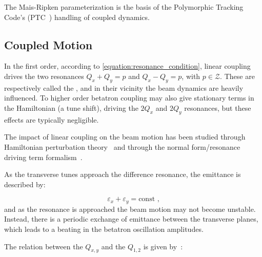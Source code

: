 The Mais-Ripken parameterization is the basis of the Polymorphic Tracking Code's (PTC~\cite{CODE:Schmidt_Forest:PTC}) handling of coupled dynamics. 

\subsection{Coupled Motion}
\label{subsection:coupled_motion}

In the first order, according to \cref{equation:resonance_condition}, linear coupling drives the two resonances \(Q_x + Q_y = p\) and \(Q_x - Q_y = p\), with \(p \in \mathcal{Z}\).
These are respectively called the , and in their vicinity the beam dynamics are heavily influenced.
To higher order betatron coupling may also give stationary terms in the Hamiltonian (a tune shift), driving the \(2 Q_x\) and \(2 Q_y\) resonances, but these effects are typically negligible.

The impact of linear coupling on the beam motion has been studied through Hamiltonian perturbation theory~\cite{PHREV:Guignard:Betatron_Coupling_Radiation,BOOK:Wiedemann:Particle_Accelerator_Physics} and through the normal form/resonance driving term formalism~\cite{PHD:Franchi}.

As the transverse tunes approach the difference resonance, the emittance is described by:

\begin{equation}
    \varepsilon_x + \varepsilon_y = \mathrm{const} \text{ ,}
    \label{equation:coupled_emittances_difference_resonance}
\end{equation}
and as the resonance is approached the beam motion may not become unstable.
Instead, there is a periodic exchange of emittance between the transverse planes, which leads to a beating in the betatron oscillation amplitudes.

The relation between the  \(Q_{x,y}\) and the  \(Q_{1,2}\) is given by~\cite{CAS:Bryant:Theory_Weak_Betatron_Coupling}:

